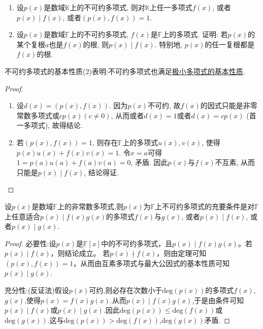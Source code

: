 \documentclass[lang=cn,newtx,10pt,scheme=chinese]{elegantbook}
\begin{document}
\begin{proposition}[不可约多项式的基本性质]\label{proposition:不可约多项式的基本性质}
\begin{enumerate}[(1)]
\item 设\(p(x)\)是数域\(\mathbb{K}\)上的不可约多项式, 则对\(\mathbb{K}\)上任一多项式\(f(x)\), 或者\(p(x)\mid f(x)\), 或者\((p(x),f(x)) = 1\).

\item 设\(p(x)\)是数域\(\mathbb{F}\)上的不可约多项式, \(f(x)\)是\(\mathbb{F}\)上的多项式. 证明: 若\(p(x)\)的某个复根\(a\)也是\(f(x)\)的根, 则\(p(x)\mid f(x)\). 特别地, \(p(x)\)的任一复根都是\(f(x)\)的根.
\end{enumerate}
\end{proposition}
\begin{note}
不可约多项式的基本性质(2)表明:不可约多项式也满足\hyperref[proposition:极小多项式的基本性质]{极小多项式的基本性质}.
\end{note}
\begin{proof}
\begin{enumerate}[(1)]
\item 设\(d(x)=(p(x),f(x))\). 因为\(p(x)\)不可约, 故\(f(x)\)的因式只能是非零常数多项式或\(cp(x)(c\neq 0)\), 从而或者\(d(x)=1\)或者\(d(x)=cp(x)\) (首一多项式), 故得结论.

\item 若\((p(x),f(x)) = 1\), 则存在\(\mathbb{F}\)上的多项式\(u(x),v(x)\), 使得\(p(x)u(x)+f(x)v(x)=1\). 令\(x = a\)可得\(1 = p(a)u(a)+f(a)v(a)=0\), 矛盾. 因此\(p(x)\)与\(f(x)\)不互素, 从而只能是\(p(x)\mid f(x)\), 结论得证. 
\end{enumerate}

\end{proof}

\begin{theorem}[不可约多项式的“素性”]\label{theorem:不可约多项式的“素性”}
设\(p(x)\)是数域\(\mathbb{F}\)上的非常数多项式,则\(p(x)\)为\(\mathbb{F}\)上不可约多项式的充要条件是对\(\mathbb{F}\)上任意适合\(p(x)\mid f(x)g(x)\)的多项式\(f(x)\)与\(g(x)\), 或者\(p(x)\mid f(x)\), 或者\(p(x)\mid g(x)\).
\end{theorem}
\begin{proof}
必要性:设\(p(x)\)是\(\mathbb{F}[x]\)中的不可约多项式，且\(p(x)\mid f(x)g(x)\)。若\(p(x)\mid f(x)\)，则结论成立。
若\(p(x)\nmid f(x)\)，则由定理可知\((p(x),f(x)) = 1\)，从而由互素多项式与最大公因式的基本性质可知\(p(x)\mid g(x)\).

充分性:(反证法)假设\(p(x)\)可约,则必存在次数小于\(\text{deg}(p(x))\)的多项式\(f(x)\),\(g(x)\),使得\(p(x) = f(x)g(x)\).从而\(p(x) \mid f(x)g(x)\),于是由条件可知\(p(x) \mid f(x)\)或\(p(x) \mid g(x)\).因此\(\text{deg}(p(x)) \leq \text{deg}(f(x))\)或\(\text{deg}(g(x))\).这与\(\text{deg}(p(x)) > \text{deg}(f(x))\),\(\text{deg}(g(x))\)矛盾.
\end{proof}
\end{document}
